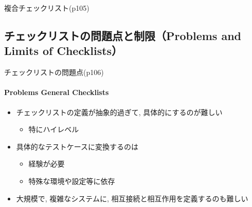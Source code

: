 \begin{frame}[shrink=5]{複合チェックリスト(p105)}
\end{frame}

\subsection{チェックリストの問題点と制限（Problems and Limits of Checklists）}
\begin{frame}{チェックリストの問題点(p106)}
\framesubtitle{Problems General Checklists}

\begin{itemize}
\item チェックリストの定義が抽象的過ぎて, 具体的にするのが難しい
    \begin{itemize}
    \item 特にハイレベル
    \end{itemize}
\item 具体的なテストケースに変換するのは
    \begin{itemize}
    \item 経験が必要
    \item 特殊な環境や設定等に依存
    \end{itemize}
\item 大規模で, 複雑なシステムに, 相互接続と相互作用を定義するのも難しい 
\end{itemize}

\end{frame}
